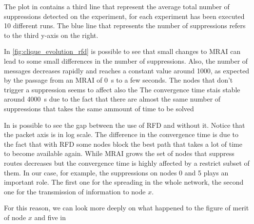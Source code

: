 The plot in  contains a third line that represent 
the average total number of suppressions detected on the experiment, for each experiment
has been executed \num{10} different runs.
The blue line that represents the number of suppressions refers to the third y-axis
on the right.

In \cref{fig:clique_evolution_rfd} is possible to see that small changes to \ac{MRAI}
can lead to some small differences in the number of suppressions.
Also, the number of messages decreases rapidly and reaches a constant 
value around \num{1000}, as expected by the passage from an \ac{MRAI} of \SI{0}{\second}
to a few seconds.
The nodes that don't trigger a suppression seems to affect also the
The convergence time stais stable around \SI{4000}{\second} due to the
fact that there are almost the same number of suppressions that takes the same
ammount of time to be solved

In  is possible to see the
gap between the use of \ac{RFD} and without it.
Notice that the packet axis is in log scale.
The difference in the convergence time is due to the fact that with \ac{RFD} some
nodes block the best path that takes a lot of time to become available again.
While \ac{MRAI} grows the set of nodes that suppress routes decreases but the
convergence time is highly affected by a restrict subset of them.
In our case, for example, the suppressions on nodes \num{0} and \num{5} plays
an important role.
The first one for the spreading in the whole network, the second one for the
transmission of information to node $x$.

For this reason, we can look more deeply on what happened to the figure of merit
of node $x$ and five in 

